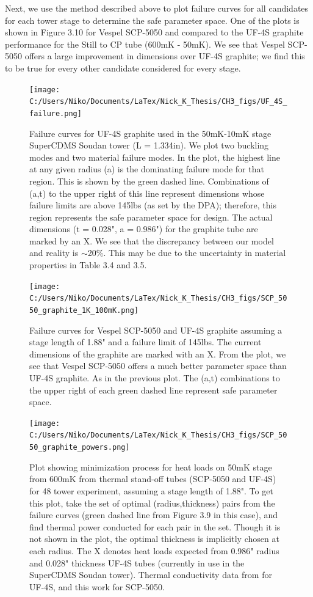 \documentclass{report}
\begin{document}
Next, we use the method described above to plot failure curves for all candidates for each tower stage to determine the safe parameter space. One of the plots is shown in Figure 3.10 for Vespel SCP-5050 and compared to the UF-4S graphite performance for the Still to CP tube (600mK - 50mK). We see that Vespel SCP-5050 offers a large improvement in dimensions over UF-4S graphite; we find this to be true for every other candidate considered for every stage.

\begin{figure}[ht]
\centering
\texttt{[image: C:/Users/Niko/Documents/LaTex/Nick\_K\_Thesis/CH3\_figs/UF\_4S\_failure.png]}
\caption{Failure curves for UF-4S graphite used in the 50mK-10mK stage SuperCDMS Soudan tower (L = 1.334in). We plot two buckling modes and two material failure modes. In the plot, the highest line at any given radius (a) is the dominating failure mode for that region. This is shown by the green dashed line. Combinations of (a,t) to the upper right of this line represent dimensions whose failure limits are above 145lbs (as set by the DPA); therefore, this region represents the safe parameter space for design. The actual dimensions (t = 0.028", a = 0.986") for the graphite tube are marked by an X. We see that the discrepancy between our model and reality is $\sim$20\%. This may be due to the uncertainty in material properties in Table 3.4 and 3.5.}
\end{figure}

\begin{figure}[h]
\centering
\texttt{[image: C:/Users/Niko/Documents/LaTex/Nick\_K\_Thesis/CH3\_figs/SCP\_5050\_graphite\_1K\_100mK.png]}
\caption{Failure curves for Vespel SCP-5050 and UF-4S graphite assuming a stage length of 1.88" and a failure limit of 145lbs. The current dimensions of the graphite are marked with an X. From the plot, we see that Vespel SCP-5050 offers a much better parameter space than UF-4S graphite. As in the previous plot. The (a,t) combinations to the upper right of each green dashed line represent safe parameter space.}
\end{figure}
\begin{figure}[h]
\centering
\texttt{[image: C:/Users/Niko/Documents/LaTex/Nick\_K\_Thesis/CH3\_figs/SCP\_5050\_graphite\_powers.png]}
\caption{Plot showing minimization process for heat loads on 50mK stage from 600mK from thermal stand-off tubes (SCP-5050 and UF-4S) for 48 tower experiment, assuming a stage length of 1.88". To get this plot, take the set of optimal (radius,thickness) pairs from the failure curves (green dashed line from Figure 3.9 in this case), and find thermal power conducted for each pair in the set. Though it is not shown in the plot, the optimal thickness is implicitly chosen at each radius. The X denotes heat loads expected from 0.986" radius and 0.028" thickness UF-4S tubes (currently in use in the SuperCDMS Soudan tower). Thermal conductivity data from \cite{lem} for UF-4S, and this work for SCP-5050.}
\end{figure}
\end{document}
